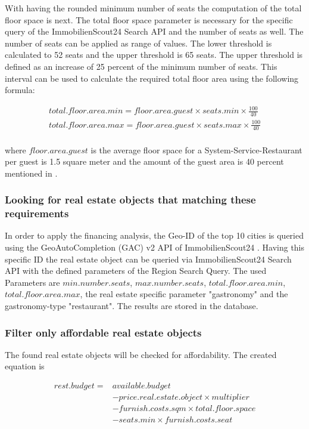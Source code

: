 With having the rounded minimum number of seats the computation of the total floor space is next. The total
 floor space parameter is necessary for the specific query of the ImmobilienScout24 Search API \cite{ImmoScout} and
 the number of seats as well. The number of seats can be applied as range of values. The lower threshold is calculated to 52 seats and
 the upper threshold is 65 seats. The upper threshold is defined as an increase of 25 percent of the minimum number of seats.
 This interval can be used to calculate the required total floor area using the following formula:

\begin{equation}
    \begin{aligned}
        total.floor.area.min = floor.area.guest \times seats.min \times \frac{100}{40} \\
        total.floor.area.max = floor.area.guest \times seats.max \times \frac{100}{40} \\
    \end{aligned}
    \label{eq:total_floor_space}
\end{equation}

where $floor.area.guest$ is the average floor space for a System-Service-Restaurant per guest is 1.5 square meter \cite{FlaecheGast} and the
 amount of the guest area is 40 percent mentioned in \cite{FlaecheGastronomie}.

\subsubsection{Looking for real estate objects that matching these requirements}
In order to apply the financing analysis, the Geo-ID of the top 10 cities is queried using the GeoAutoCompletion (GAC)
 v2 \ac{API} of ImmobilienScout24 \cite{ImmoScout}. Having this specific ID the real estate object can be queried via ImmobilienScout24 Search \ac{API}
 with the defined parameters of the Region Search Query. The used Parameters are $min.number.seats$,
 $max.number.seats$, $total.floor.area.min$, $total.floor.area.max$, the real estate specific parameter
 "gastronomy" and the gastronomy-type "restaurant". The results are stored in the \pg{} database.

\subsubsection{Filter only affordable real estate objects}
The found real estate objects will be checked for affordability. The created equation is
\begin{center}
    \begin{equation}
        \begin{aligned}
        rest.budget = & available.budget \\
            &- price.real.estate.object \times multiplier \\
            &- furnish.costs.sqm \times total.floor.space \\
            &- seats.min \times furnish.costs.seat
        \end{aligned}
        \label{eq:affordable}
    \end{equation}
\end{center}

